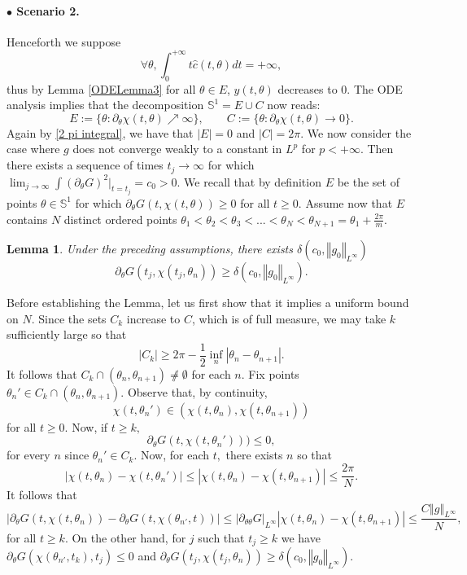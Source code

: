\documentclass[10pt]{article}
\numberwithin{equation}{section}
\theoremstyle{plain}
\newtheorem{lemma}{Lemma}[section]
\theoremstyle{definition}
\newcommand{\norm}[1]{\left\Vert #1 \right\Vert}
\newcommand{\abs}[1]{\left| #1 \right|}
\numberwithin{equation}{section}
\begin{document}
\paragraph{\textbf{$\bullet$ Scenario 2.}}
Henceforth we suppose 
\[
\forall \theta, \int_0^{+\infty}t\hat{c}(t,\theta)dt=+\infty,
\]
thus by Lemma \ref{ODELemma3} for all $\theta \in E$, $y(t,\theta)$ decreases to $0$. The ODE analysis implies that the decomposition $\mathbb{S}^1=E\cup C$ now reads:
 \[E:=\{\theta: \partial_\theta \chi(t,\theta)\nearrow\infty\},\qquad C:=\{\theta: \partial_\theta \chi(t,\theta)\rightarrow 0\}.\]
 Again by \eqref{2 pi integral}, we have that $|E|=0$ and $|C|=2\pi$. We now consider the case where $g$ does not converge weakly to a constant in $L^p$ for $p<+\infty$.  
 Then there exists a sequence of times $t_j\rightarrow\infty$ for which $\lim_{j\rightarrow \infty}\int(\partial_\theta G)^2|_{t=t_j}=c_0>0.$  We recall that by definition $E$ be the set of points $\theta\in\mathbb{S}^1$ for which $\partial_\theta G(t,\chi(t,\theta))\geq 0$ for all $t\geq 0.$ Assume now that $E$ contains $N$ distinct ordered points $\theta_1<\theta_2<\theta_3<...<\theta_N<\theta_{N+1}=\theta_1+\frac{2\pi}{m}.$
 \begin{lemma}\label{lem prf rlx thm:lower bound on E}
 Under the preceding assumptions, there exists $\delta(c_0, \norm{g_0}_{L^\infty})$
 \[\partial_\theta G(t_j,\chi(t_j,\theta_n))\geq \delta(c_0, \norm{g_0}_{L^\infty}).\]
 \end{lemma}
Before establishing the Lemma, let us first show that it implies a uniform bound on $N$. Since the sets $C_k$ increase to $C$, which is of full measure, we may take $k$ sufficiently large so that \[\abs{C_k}\geq 2\pi -\frac{1}{2}\inf_n |\theta_n-\theta_{n+1}|.\] It follows that $C_k\cap (\theta_n,\theta_{n+1})\not\neq \emptyset$ for each $n.$ Fix points $\theta_{n}'\in C_k\cap (\theta_n,\theta_{n+1}).$ Observe that, by continuity, \[\chi(t,\theta_{n}')\in (\chi(t,\theta_n), \chi(t,\theta_{n+1}))\] for all $t\geq 0.$ Now, if $t\geq k,$
\[\partial_\theta G(t,\chi(t,\theta_n')))\leq 0,\] for every $n$ since $\theta_n'\in C_k.$ Now, for each $t,$ there exists $n$ so that \[|\chi(t,\theta_n)-\chi(t,\theta_{n}')|\leq |\chi(t,\theta_n)-\chi(t,\theta_{n+1})|\leq \frac{2\pi}{N}.\]
It follows that \[|\partial_\theta G(t,\chi(t,\theta_n))-\partial_\theta G(t,\chi(\theta_{n'},t))|\leq |\partial_{\theta\theta}G|_{L^\infty}|\chi(t,\theta_n)-\chi(t,\theta_{n+1})|\leq \frac{C\norm{g}_{L^\infty}}{N},\] for all $t\geq k$. On the other hand, for $j$ such that $t_j\geq k$ we have $\partial_\theta G(\chi(\theta_{n'},t_k),t_j)\leq 0$ and $\partial_\theta G(t_j,\chi(t_j,\theta_n))\geq \delta(c_0,\norm{g_0}_{L^\infty}).$
\end{document}
